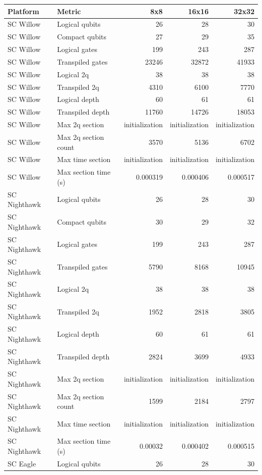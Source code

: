 \begin{table}
\centering
\scriptsize
\begin{tabular}{llrrr}
\hline
Platform & Metric & 8x8 & 16x16 & 32x32 \\
\hline
SC Willow & Logical qubits & 26 & 28 & 30 \\
SC Willow & Compact qubits & 27 & 29 & 35 \\
SC Willow & Logical gates & 199 & 243 & 287 \\
SC Willow & Transpiled gates & 23246 & 32872 & 41933 \\
SC Willow & Logical 2q & 38 & 38 & 38 \\
SC Willow & Transpiled 2q & 4310 & 6100 & 7770 \\
SC Willow & Logical depth & 60 & 61 & 61 \\
SC Willow & Transpiled depth & 11760 & 14726 & 18053 \\
SC Willow & Max 2q section & initialization & initialization & initialization \\
SC Willow & Max 2q section count & 3570 & 5136 & 6702 \\
SC Willow & Max time section & initialization & initialization & initialization \\
SC Willow & Max section time (s) & 0.000319 & 0.000406 & 0.000517 \\
\hline
SC Nighthawk & Logical qubits & 26 & 28 & 30 \\
SC Nighthawk & Compact qubits & 30 & 29 & 32 \\
SC Nighthawk & Logical gates & 199 & 243 & 287 \\
SC Nighthawk & Transpiled gates & 5790 & 8168 & 10945 \\
SC Nighthawk & Logical 2q & 38 & 38 & 38 \\
SC Nighthawk & Transpiled 2q & 1952 & 2818 & 3805 \\
SC Nighthawk & Logical depth & 60 & 61 & 61 \\
SC Nighthawk & Transpiled depth & 2824 & 3699 & 4933 \\
SC Nighthawk & Max 2q section & initialization & initialization & initialization \\
SC Nighthawk & Max 2q section count & 1599 & 2184 & 2797 \\
SC Nighthawk & Max time section & initialization & initialization & initialization \\
SC Nighthawk & Max section time (s) & 0.00032 & 0.000402 & 0.000515 \\
\hline
SC Eagle & Logical qubits & 26 & 28 & 30 \\

\end{tabular}
\end{table}
